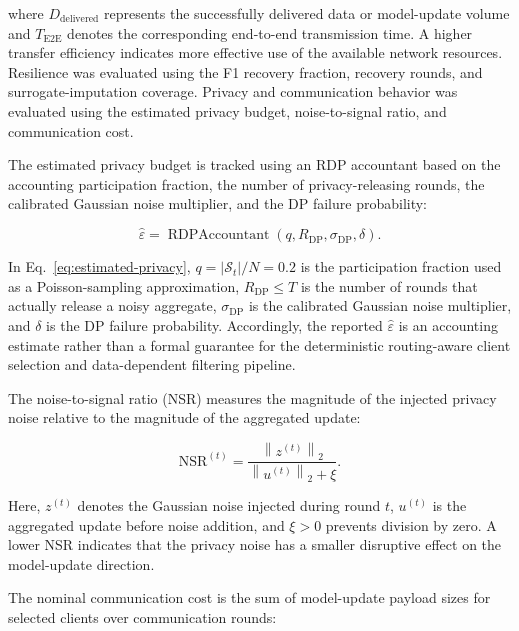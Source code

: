 \documentclass[5p,times,numafflabel]{elsarticle}
\begin{document}
	where \(D_{\mathrm{delivered}}\) represents the successfully delivered
	data or model-update volume and \(T_{\mathrm{E2E}}\) denotes the
	corresponding end-to-end transmission time. A higher transfer
	efficiency indicates more effective use of the available network
	resources.
	Resilience was evaluated using the F1 recovery fraction, recovery
	rounds, and surrogate-imputation coverage. Privacy and communication behavior was evaluated
	using the estimated privacy budget, noise-to-signal ratio, and
	communication cost.
	

	
The estimated privacy budget is tracked using an RDP accountant based
on the accounting participation fraction, the number of
privacy-releasing rounds, the calibrated Gaussian noise multiplier,
and the DP failure probability:
	
\begin{equation}
	\widehat{\varepsilon}
	=
	\operatorname{RDPAccountant}
	\left(
	q,R_{\mathrm{DP}},\sigma_{\mathrm{DP}},\delta
	\right).
	\label{eq:estimated-privacy}
\end{equation}
	
	In Eq.~\eqref{eq:estimated-privacy},
	\(q=|\mathcal{S}_t|/N=0.2\) is the participation fraction used as a
	Poisson-sampling approximation, \(R_{\mathrm{DP}}\leq T\) is the
	number of rounds that actually release a noisy aggregate,
	\(\sigma_{\mathrm{DP}}\) is the calibrated Gaussian noise multiplier,
	and \(\delta\) is the DP failure probability.
	Accordingly, the reported \(\widehat{\varepsilon}\) is an accounting
	estimate rather than a formal guarantee for the deterministic
	routing-aware client selection and data-dependent filtering pipeline.
	
	The noise-to-signal ratio (NSR) measures the magnitude of the injected
	privacy noise relative to the magnitude of the aggregated update:
	
	\begin{equation}
		\mathrm{NSR}^{(t)}
		=
		\frac{
			\left\|z^{(t)}\right\|_{2}
		}{
			\left\|u^{(t)}\right\|_{2}+\xi
		}.
		\label{eq:nsr}
	\end{equation}
	
	Here, \(z^{(t)}\) denotes the Gaussian noise injected during round
	\(t\), \(u^{(t)}\) is the aggregated update before noise addition, and
	\(\xi>0\) prevents division by zero. A lower NSR indicates that the
	privacy noise has a smaller disruptive effect on the model-update
	direction.
	
	The nominal communication cost is the sum of model-update payload
	sizes for selected clients over communication rounds:
	
\end{document}
